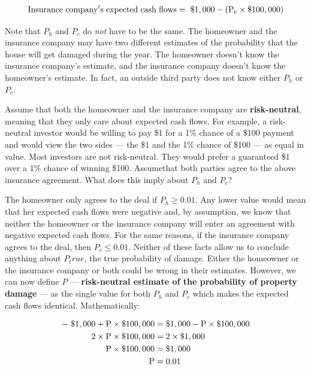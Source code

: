 \documentclass{jss}
\begin{document}
\begin{equation}
 \begin{aligned}
   {\rm Insurance\hspace{3pt}company's\hspace{3pt}expected\hspace{3pt}cash\hspace{3pt}flows = \hspace{3pt}\$1,000 - (P_c \times {\$100,000})}
    \end{aligned}
    \label{eqn:companyECF}
\end{equation}

Note that $P_h$ and $P_c$ do \emph{not} have to be the same. The homeowner and the insurance company may have two different estimates of the probability that the house will get damaged during the year. The homeowner doesn't know the insurance company's estimate, and the insurance company doesn't know the homeowner's estimate. In fact, an outside third party does not know either $P_h$ or $P_c$. 

Assume that both the homeowner and the insurance company are \textbf{risk-neutral}, meaning that they only care about expected cash flows. For example, a risk-neutral investor would be willing to pay \$1 for a 1\% chance of a \$100 payment and would view the two sides --- the \$1 and the 1\% chance of \$100 --- as equal in value. Most investors are not risk-neutral. They would prefer a guaranteed \$1 over a 1\% chance of winning \$100. Assumethat both parties agree to the above insurance agreement. What does this imply about $P_h$ and $P_c$? 

The homeowner only agrees to the deal if $P_h \geq 0.01$. Any lower value would mean that her expected cash flows were negative and, by assumption, we know that neither the homeowner or the insurance company will enter an agreement with negative expected cash flows. For the same reasons, if the insurance company agrees to the deal, then $P_c \leq 0.01$. Neither of these facts allow us to conclude anything about $P_true$, the true probability of damage. Either the homeowner or the insurance company or both could be wrong in their estimates. However, we can now define $P$ --- \textbf{risk-neutral estimate of the probability of property damage} --- as the single value for both $P_h$ and $P_c$ which makes the expected cash flows identical. Mathematically:

\label{eqn:PropertyInsurance}
\begin{align}
  \rm -\hspace{3pt}\$1,000 + P \times {\$100,000}  &= \rm \$1,000 - P \times {\$100,000} \\
  \rm 2 \times P \times {\$100,000}  &=  \rm 2 \times \$1,000 \\
  \rm P \times {\$100,000}  &= \rm {\$1,000} \\
  \rm P  &= \rm 0.01
\end{align}
\end{document}
